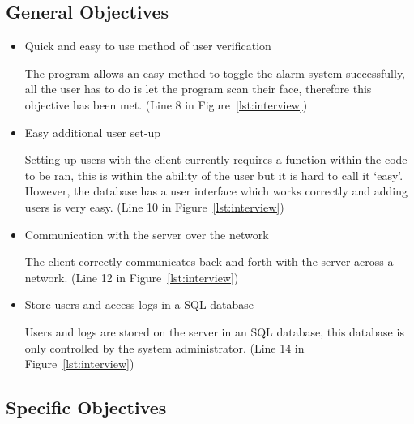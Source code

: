 \documentclass[12pt,a4paper]{report}
\newcounter{Figure}
\begin{document}
	\subsection{General Objectives}
	
		\begin{itemize}
			\item Quick and easy to use method of user verification

			The program allows an easy method to toggle the alarm system successfully, all the user has
			to do is let the program scan their face, therefore this objective has been met. (Line 8 in Figure~\ref{lst:interview})


			\item Easy additional user set-up

			Setting up users with the client currently requires a function within the code to be ran,
			this is within the ability of the user but it is hard to call it `easy'. However, the database
			has a user interface which works correctly and adding users is very easy. (Line 10 in Figure~\ref{lst:interview})

			\item Communication with the server over the network

			The client correctly communicates back and forth with the server across a network. (Line 12 in Figure~\ref{lst:interview})
 
			\item Store users and access logs in a SQL database

			Users and logs are stored on the server in an SQL database, this database is only controlled
			by the system administrator. (Line 14 in Figure~\ref{lst:interview})
		\end{itemize}

	\subsection{Specific Objectives}
\end{document}
